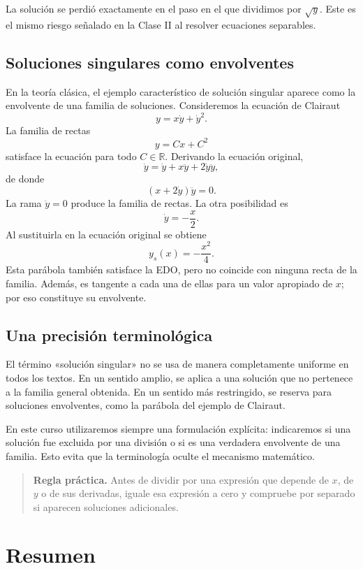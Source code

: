 \documentclass[12pt,a4paper]{article}
\begin{document}
	La solución se perdió exactamente en el paso en el que dividimos por \(\sqrt{y}\). Este es el mismo riesgo señalado en la Clase II al resolver ecuaciones separables.

	\subsection{Soluciones singulares como envolventes}

	En la teoría clásica, el ejemplo característico de solución singular aparece como la envolvente de una familia de soluciones. Consideremos la ecuación de Clairaut
	\[
	y=x\dot{y}+\dot{y}^{2}.
	\]
La familia de rectas
	\[
	y=Cx+C^2
	\]
satisface la ecuación para todo \(C\in\mathbb{R}\). Derivando la ecuación original,
	\[
	\dot{y}
	=
	\dot{y}
	+x\ddot{y}
	+2\dot{y}\ddot{y},
	\]
de donde
	\[
	\left(x+2\dot{y}\right)\ddot{y}=0.
	\]
La rama \(\ddot{y}=0\) produce la familia de rectas. La otra posibilidad es
	\[
	\dot{y}=-\frac{x}{2}.
	\]
Al sustituirla en la ecuación original se obtiene
	\[
	y_s(x)=-\frac{x^2}{4}.
	\]
Esta parábola también satisface la EDO, pero no coincide con ninguna recta de la familia. Además, es tangente a cada una de ellas para un valor apropiado de \(x\); por eso constituye su envolvente.

	\subsection{Una precisión terminológica}

	El término «solución singular» no se usa de manera completamente uniforme en todos los textos. En un sentido amplio, se aplica a una solución que no pertenece a la familia general obtenida. En un sentido más restringido, se reserva para soluciones envolventes, como la parábola del ejemplo de Clairaut.

	En este curso utilizaremos siempre una formulación explícita: indicaremos si una solución fue excluida por una división o si es una verdadera envolvente de una familia. Esto evita que la terminología oculte el mecanismo matemático.

	\begin{quote}
		\textbf{Regla práctica.} Antes de dividir por una expresión que depende de \(x\), de \(y\) o de sus derivadas, iguale esa expresión a cero y compruebe por separado si aparecen soluciones adicionales.
	\end{quote}

	\clearpage
	\section{Resumen}
\end{document}
